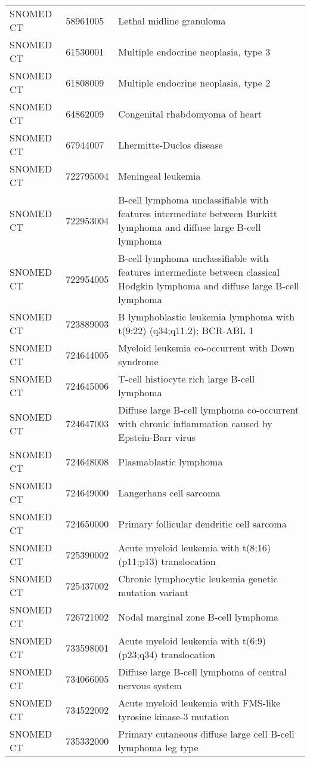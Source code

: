 \begin{longtable}{p{}p{}p{}}
  SNOMED CT & 58961005 & Lethal midline granuloma \\ 
  SNOMED CT & 61530001 & Multiple endocrine neoplasia, type 3 \\ 
  SNOMED CT & 61808009 & Multiple endocrine neoplasia, type 2 \\ 
  SNOMED CT & 64862009 & Congenital rhabdomyoma of heart \\ 
  SNOMED CT & 67944007 & Lhermitte-Duclos disease \\ 
  SNOMED CT & 722795004 & Meningeal leukemia \\ 
  SNOMED CT & 722953004 & B-cell lymphoma unclassifiable with features intermediate between Burkitt lymphoma and diffuse large B-cell lymphoma \\ 
  SNOMED CT & 722954005 & B-cell lymphoma unclassifiable with features intermediate between classical Hodgkin lymphoma and diffuse large B-cell lymphoma \\ 
  SNOMED CT & 723889003 & B lymphoblastic leukemia lymphoma with t(9:22) (q34;q11.2); BCR-ABL 1 \\ 
  SNOMED CT & 724644005 & Myeloid leukemia co-occurrent with Down syndrome \\ 
  SNOMED CT & 724645006 & T-cell histiocyte rich large B-cell lymphoma \\ 
  SNOMED CT & 724647003 & Diffuse large B-cell lymphoma co-occurrent with chronic inflammation caused by Epstein-Barr virus \\ 
  SNOMED CT & 724648008 & Plasmablastic lymphoma \\ 
  SNOMED CT & 724649000 & Langerhans cell sarcoma \\ 
  SNOMED CT & 724650000 & Primary follicular dendritic cell sarcoma \\ 
  SNOMED CT & 725390002 & Acute myeloid leukemia with t(8;16)(p11;p13) translocation \\ 
  SNOMED CT & 725437002 & Chronic lymphocytic leukemia genetic mutation variant \\ 
  SNOMED CT & 726721002 & Nodal marginal zone B-cell lymphoma \\ 
  SNOMED CT & 733598001 & Acute myeloid leukemia with t(6;9)(p23;q34) translocation \\ 
  SNOMED CT & 734066005 & Diffuse large B-cell lymphoma of central nervous system \\ 
  SNOMED CT & 734522002 & Acute myeloid leukemia with FMS-like tyrosine kinase-3 mutation \\ 
  SNOMED CT & 735332000 & Primary cutaneous diffuse large cell B-cell lymphoma leg type \\ 

\end{longtable}
